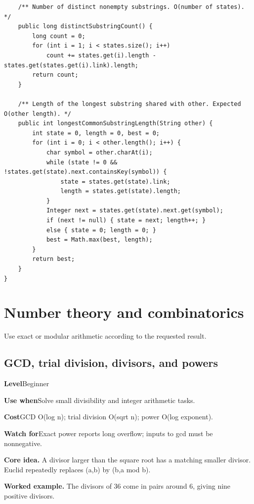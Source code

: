 \documentclass[10pt,letterpaper]{article}
\newcommand{\entrylabel}[1]{\textcolor{accent}{\bfseries #1}}
\begin{document}
\begin{lstlisting}
    /** Number of distinct nonempty substrings. O(number of states). */
    public long distinctSubstringCount() {
        long count = 0;
        for (int i = 1; i < states.size(); i++)
            count += states.get(i).length - states.get(states.get(i).link).length;
        return count;
    }

    /** Length of the longest substring shared with other. Expected O(other length). */
    public int longestCommonSubstringLength(String other) {
        int state = 0, length = 0, best = 0;
        for (int i = 0; i < other.length(); i++) {
            char symbol = other.charAt(i);
            while (state != 0 && !states.get(state).next.containsKey(symbol)) {
                state = states.get(state).link;
                length = states.get(state).length;
            }
            Integer next = states.get(state).next.get(symbol);
            if (next != null) { state = next; length++; }
            else { state = 0; length = 0; }
            best = Math.max(best, length);
        }
        return best;
    }
}
\end{lstlisting}
\section{Number theory and combinatorics}
\begin{guidebox}Use exact or modular arithmetic according to the requested result.\end{guidebox}
\subsection{GCD, trial division, divisors, and powers}
\begin{guidebox}\small
\entrylabel{Level}\quad Beginner\par
\entrylabel{Use when}\quad Solve small divisibility and integer arithmetic tasks.\par
\entrylabel{Cost}\quad GCD O(log n); trial division O(sqrt n); power O(log exponent).\par
\entrylabel{Watch for}\quad Exact power reports long overflow; inputs to gcd must be nonnegative.\par
\end{guidebox}
\noindent\textbf{Core idea.} A divisor larger than the square root has a matching smaller divisor. Euclid repeatedly replaces (a,b) by (b,a mod b).\par
\noindent\textbf{Worked example.} The divisors of 36 come in pairs around 6, giving nine positive divisors.\par
\end{document}
